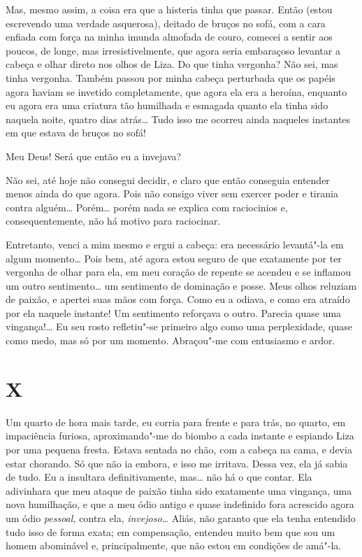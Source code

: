 Mas, mesmo assim, a coisa era que a histeria tinha que passar. Então
(estou escrevendo uma verdade asquerosa), deitado de bruços no sofá, com
a cara enfiada com força na minha imunda almofada de couro, comecei a
sentir aos poucos, de longe, mas irresistivelmente, que agora seria
embaraçoso levantar a cabeça e olhar direto nos olhos de Liza. Do que
tinha vergonha? Não sei, mas tinha vergonha. Também passou por minha
cabeça perturbada que os papéis agora haviam se invetido completamente,
que agora ela era a heroína, enquanto eu agora era uma criatura tão
humilhada e esmagada quanto ela tinha sido naquela noite, quatro dias
atrás\ldots{} Tudo isso me ocorreu ainda naqueles instantes em que estava de
bruços no sofá!

Meu Deus! Será que então eu a invejava?

Não sei, até hoje não consegui decidir, e claro que então conseguia
entender menos ainda do que agora. Pois não consigo viver sem exercer
poder e tirania contra alguém\ldots{} Porém\ldots{} porém nada se explica com
raciocinios e, consequentemente, não há motivo para raciocinar.

Entretanto, venci a mim mesmo e ergui a cabeça: era necessário
levantá"-la em algum momento\ldots{} Pois bem, até agora estou seguro de que
exatamente por ter vergonha de olhar para ela, em meu coração de repente
se acendeu e se inflamou um outro sentimento\ldots{} um sentimento de
dominação e posse. Meus olhos reluziam de paixão, e apertei suas mãos
com força. Como eu a odiava, e como era atraído por ela naquele
instante! Um sentimento reforçava o outro. Parecia quase uma
vingança!\ldots{} Eu seu rosto refletiu"-se primeiro algo como uma
perplexidade, quase como medo, mas só por um momento. Abraçou"-me com
entusiasmo e ardor.

\section{X}

Um quarto de hora mais tarde, eu corria para frente e para trás, no
quarto, em impaciência furiosa, aproximando"-me do biombo a cada instante
e espiando Liza por uma pequena fresta. Estava sentada no chão, com a
cabeça na cama, e devia estar chorando. Só que não ia embora, e isso me
irritava. Dessa vez, ela já sabia de tudo. Eu a insultara
definitivamente, mas\ldots{} não há o que contar. Ela adivinhara que meu
ataque de paixão tinha sido exatamente uma vingança, uma nova
humilhação, e que a meu ódio antigo e quase indefinido fora acrescido
agora um ódio \emph{pessoal,} contra ela, \emph{invejoso\ldots{}} Aliás, não
garanto que ela tenha entendido tudo isso de forma exata; em
compensação, entendeu muito bem que sou um homem abominável e,
principalmente, que não estou em condições de amá"-la.

